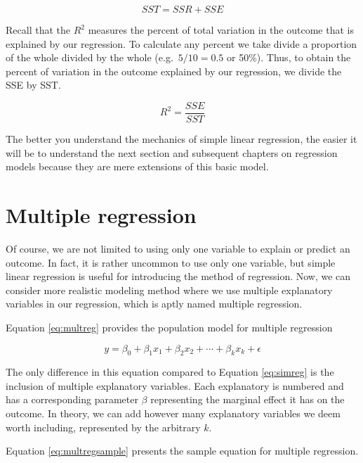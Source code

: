 \documentclass[
]{book}
\begin{document}
\begin{equation}
SST = SSR + SSE
\label{eq:sst}
\end{equation}

Recall that the \(R^2\) measures the percent of total variation in the outcome that is explained by our regression. To calculate any percent we take divide a proportion of the whole divided by the whole (e.g.~\(5/10 = 0.5\) or 50\%). Thus, to obtain the percent of variation in the outcome explained by our regression, we divide the SSE by SST.

\begin{equation}
R^2 = {\frac{SSE}{SST}}
\label{eq:r2}
\end{equation}

The better you understand the mechanics of simple linear regression, the easier it will be to understand the next section and subsequent chapters on regression models because they are mere extensions of this basic model.

\hypertarget{multiple-regression}{%
\section{Multiple regression}\label{multiple-regression}}

Of course, we are not limited to using only one variable to explain or predict an outcome. In fact, it is rather uncommon to use only one variable, but simple linear regression is useful for introducing the method of regression. Now, we can consider more realistic modeling method where we use multiple explanatory variables in our regression, which is aptly named multiple regression.

Equation \eqref{eq:multreg} provides the population model for multiple regression

\begin{equation}
y=\beta_0+\beta_1x_1+\beta_2x_2+\cdots+\beta_kx_k+\epsilon
\label{eq:multreg}
\end{equation}

The only difference in this equation compared to Equation \eqref{eq:simreg} is the inclusion of multiple explanatory variables. Each explanatory is numbered and has a corresponding parameter \(\beta\) representing the marginal effect it has on the outcome. In theory, we can add however many explanatory variables we deem worth including, represented by the arbitrary \(k\).

Equation \eqref{eq:multregsample} presents the sample equation for multiple regression.
\end{document}
